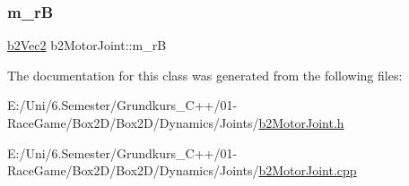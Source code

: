 \mbox{\label{classb2_motor_joint_a85c605b404e4b087e2932fdf23b447d5}} 
\subsubsection{\texorpdfstring{m\_rB}{m\_rB}}
{\footnotesize\ttfamily \mbox{\hyperlink{structb2_vec2}{b2\+Vec2}} b2\+Motor\+Joint\+::m\+\_\+rB\hspace{0.3cm}{\ttfamily [protected]}}



The documentation for this class was generated from the following files\+:\begin{DoxyCompactItemize}
\item 
E\+:/\+Uni/6.\+Semester/\+Grundkurs\+\_\+\+C++/01-\/\+Race\+Game/\+Box2\+D/\+Box2\+D/\+Dynamics/\+Joints/\mbox{\hyperlink{b2_motor_joint_8h}{b2\+Motor\+Joint.\+h}}\item 
E\+:/\+Uni/6.\+Semester/\+Grundkurs\+\_\+\+C++/01-\/\+Race\+Game/\+Box2\+D/\+Box2\+D/\+Dynamics/\+Joints/\mbox{\hyperlink{b2_motor_joint_8cpp}{b2\+Motor\+Joint.\+cpp}}\end{DoxyCompactItemize}

